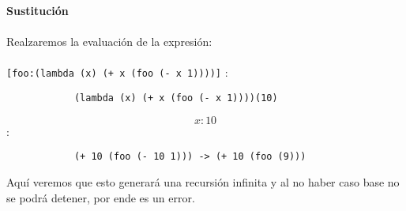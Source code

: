 \textbf{Sustitución}\\
        \\
        Realzaremos la evaluación de la expresión:\\
        \\
        \texttt{[foo:(lambda (x) (+ x (foo (- x 1))))]} :\\
        \begin{verbatim}
            (lambda (x) (+ x (foo (- x 1))))(10)
        \end{verbatim}
        
        $$x:10$$:
        \begin{verbatim}
            (+ 10 (foo (- 10 1))) -> (+ 10 (foo (9)))
        \end{verbatim}
        Aquí veremos que esto generará una recursión infinita y al no haber caso base no se podrá detener, por ende es un error.
        